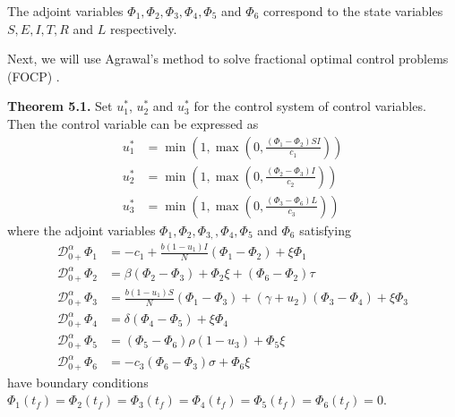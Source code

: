 \documentclass[10pt]{article}
\newcommand{\CD}{\mathcal{D}}
\begin{document}
	The adjoint variables $\Phi_{1},\Phi_{2},\Phi_{3},\Phi_{4},\Phi_{5}$ and $\Phi_{6}$ correspond to the state variables $S,E,I,T,R$ and $L$ respectively.
	
	Next, we will use Agrawal's method to solve fractional optimal control problems (FOCP) \cite{ref38}.
	
	\textbf{Theorem 5.1.} Set $u_{1}^{\ast}$, $u_{2}^{\ast}$ and $u_{3}^{\ast}$ for the control system of control variables. Then the control variable can be expressed as
	\begin{align}
		u_{1}^{\ast} &= \min\left(1, \max\left(0, \frac{(\Phi_{1} - \Phi_{2})SI}{c_{1}}\right)\right) \\
		u_{2}^{\ast} &= \min\left(1, \max\left(0, \frac{(\Phi_{2} - \Phi_{3})I}{c_{2}}\right)\right) \\
		u_{3}^{\ast} &= \min\left(1, \max\left(0, \frac{(\Phi_{3} - \Phi_{6})L}{c_{3}}\right)\right)
		\label{eq:optimal_u}
	\end{align}
	where the adjoint variables $\Phi_{1},\Phi_{2},\Phi_{3,},\Phi_{4},\Phi_{5}$ and $\Phi_{6}$ satisfying
	\begin{align}
		\CD_{0+}^{\alpha}\Phi_{1} &= - c_{1} + \frac{b (1 - u_{1})I}{N}(\Phi_{1} - \Phi_{2}) + \xi\Phi_{1} \\
		\CD_{0+}^{\alpha}\Phi_{2} &= \beta(\Phi_{2} - \Phi_{3}) + \Phi_{2}\xi + (\Phi_{6} - \Phi_{2})\tau \\
		\CD_{0+}^{\alpha}\Phi_{3} &= \frac{b (1 - u_{1})S}{N}(\Phi_{1} - \Phi_{3}) + (\gamma + u_{2})(\Phi_{3} - \Phi_{4}) + \xi\Phi_{3} \\
		\CD_{0+}^{\alpha}\Phi_{4} &= \delta(\Phi_{4} - \Phi_{5}) + \xi\Phi_{4} \\
		\CD_{0+}^{\alpha}\Phi_{5} &= (\Phi_{5} - \Phi_{6})\rho(1 - u_{3}) + \Phi_{5}\xi \\
		\CD_{0+}^{\alpha}\Phi_{6} &= - c_{3}(\Phi_{6} - \Phi_{3})\sigma + \Phi_{6}\xi
		\label{eq:adjoint}
	\end{align}
	have boundary conditions $\Phi_{1}(t_{f}) = \Phi_{2}(t_{f}) = \Phi_{3}(t_{f}) = \Phi_{4}(t_{f}) = \Phi_{5}(t_{f}) = \Phi_{6}(t_{f}) = 0$.
	
\end{document}

